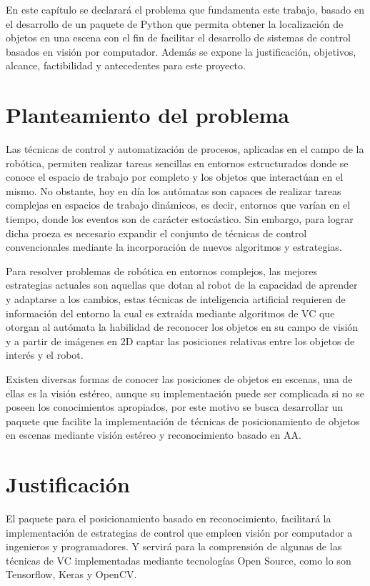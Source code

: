 En este capítulo se declarará el problema que fundamenta este trabajo, basado en el desarrollo de un paquete de Python que permita obtener la localización de objetos en una escena con el fin de facilitar el desarrollo de sistemas de control basados en visión por computador. Además se expone la justificación, objetivos, alcance, factibilidad y antecedentes para este proyecto.

\section{Planteamiento del problema}
Las técnicas de control y automatización de procesos, aplicadas en el campo de la robótica, permiten realizar tareas sencillas en entornos estructurados donde se conoce el espacio de trabajo por completo y los objetos que interactúan en el mismo. No obstante, hoy en día los autómatas son capaces de realizar tareas complejas en espacios de trabajo dinámicos, es decir, entornos que varían en el tiempo, donde los eventos son de carácter estocástico. Sin embargo, para lograr dicha proeza es necesario expandir el conjunto de técnicas de control convencionales mediante la incorporación de nuevos algoritmos y estrategias.  

Para resolver problemas de robótica en entornos complejos, las mejores estrategias actuales son aquellas que dotan al robot de la capacidad de aprender y adaptarse a los cambios, estas técnicas de inteligencia artificial requieren de información del entorno la cual es extraída mediante algoritmos de VC que otorgan al autómata la habilidad de reconocer los objetos en su campo de visión y a partir de imágenes en 2D captar las posiciones relativas entre los objetos de interés y el robot. 

Existen diversas formas de conocer las posiciones de objetos en escenas, una de ellas es la visión estéreo, aunque su implementación puede ser complicada si no se poseen los conocimientos apropiados, por este motivo se busca desarrollar un paquete que facilite la implementación de técnicas de posicionamiento de objetos en escenas mediante visión estéreo y reconocimiento basado en AA.
\section{Justificación}
El paquete para el posicionamiento basado en reconocimiento, facilitará la implementación de estrategias de control que empleen visión por computador a ingenieros y programadores. Y servirá para la comprensión de algunas de las técnicas de VC implementadas mediante tecnologías Open Source, como lo son Tensorflow, Keras y OpenCV.

